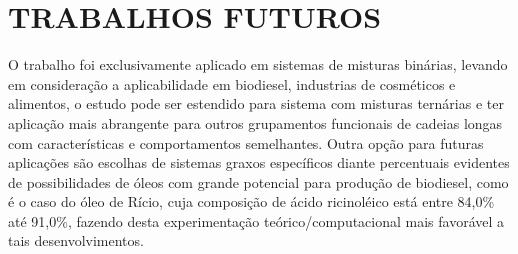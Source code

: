 \chapter{TRABALHOS FUTUROS}
\label{sec:trabalhosFuturos}

O trabalho foi exclusivamente aplicado em sistemas de misturas binárias, levando em consideração a aplicabilidade em biodiesel, industrias de cosméticos e alimentos, o estudo pode ser estendido para sistema com misturas ternárias e ter aplicação mais abrangente para outros grupamentos funcionais de cadeias longas com características e comportamentos semelhantes. 
Outra opção para futuras aplicações são escolhas de sistemas graxos específicos diante percentuais evidentes de possibilidades de óleos com grande potencial para produção de biodiesel, como é o caso do óleo de Rício, cuja composição de ácido ricinoléico está entre 84,0\% até 91,0\%, fazendo desta experimentação teórico/computacional mais favorável a tais desenvolvimentos. 

